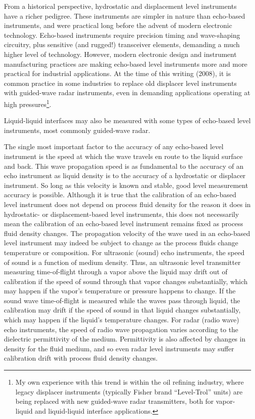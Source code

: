 From a historical perspective, hydrostatic and displacement level instruments have a richer pedigree.  These instruments are simpler in nature than echo-based instruments, and were practical long before the advent of modern electronic technology.  Echo-based instruments require precision timing and wave-shaping circuitry, plus sensitive (and rugged!) transceiver elements, demanding a much higher level of technology.  However, modern electronic design and instrument manufacturing practices are making echo-based level instruments more and more practical for industrial applications.  At the time of this writing (2008), it is common practice in some industries to replace old displacer level instruments with guided-wave radar instruments, even in demanding applications operating at high pressures\footnote{My own experience with this trend is within the oil refining industry, where legacy displacer instruments (typically Fisher brand ``Level-Trol'' units) are being replaced with new guided-wave radar transmitters, both for vapor-liquid and liquid-liquid interface applications.}. 

Liquid-liquid interfaces may also be measured with some types of echo-based level instruments, most commonly guided-wave radar.  

The single most important factor to the accuracy of any echo-based level instrument is the speed at which the wave travels en route to the liquid surface and back.  This wave propagation speed is as fundamental to the accuracy of an echo instrument as liquid density is to the accuracy of a hydrostatic or displacer instrument.  So long as this velocity is known and stable, good level measurement accuracy is possible.  Although it is true that the calibration of an echo-based level instrument does not depend on process fluid density for the reason it does in hydrostatic- or displacement-based level instruments, this does not necessarily mean the calibration of an echo-based level instrument remains fixed as process fluid density changes.  The propagation velocity of the wave used in an echo-based level instrument may indeed be subject to change as the process fluids change temperature or composition.  For ultrasonic (sound) echo instruments, the speed of sound is a function of medium density.  Thus, an ultrasonic level transmitter measuring time-of-flight through a vapor above the liquid may drift out of calibration if the speed of sound through that vapor changes substantially, which may happen if the vapor's temperature or pressure happens to change.  If the sound wave time-of-flight is measured while the waves pass through liquid, the calibration may drift if the speed of sound in that liquid changes substantially, which may happen if the liquid's temperature changes.  For radar (radio wave) echo instruments, the speed of radio wave propagation varies according to the dielectric permittivity of the medium.  Permittivity is also affected by changes in density for the fluid medium, and so even radar level instruments may suffer calibration drift with process fluid density changes.

